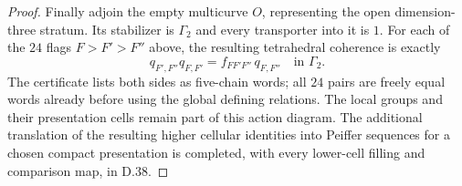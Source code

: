 \begin{proof}
Finally adjoin the empty multicurve $O$, representing
the open dimension-three stratum.  Its stabilizer is
$\Gamma_2$ and every transporter into it is $1$.
For each of the $24$ flags $F>F'>F''$ above, the
resulting tetrahedral coherence is exactly
\[
 q_{F',F''}q_{F,F'}
        =f_{FF'F''}\,q_{F,F''}\quad\text{in }\Gamma_2.       \tag{D.21}
\]
The certificate lists both sides as five-chain words;
all $24$ pairs are freely equal words already before
using the global defining relations.  The local groups
and their presentation cells remain part of this action
diagram.  The additional translation of the resulting
higher cellular identities into Peiffer sequences for a
chosen compact presentation is completed, with every
lower-cell filling and comparison map, in D.38.
\end{proof}
